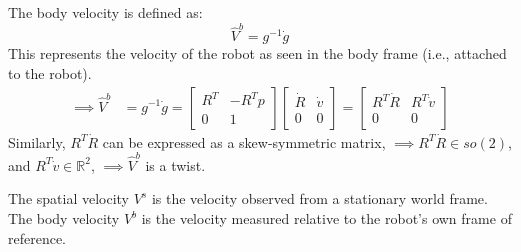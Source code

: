 The body velocity is defined as:
\[
    \hat{V}^{b} = g^{-1} \dot{g}
\]
This represents the velocity of the robot as seen in the body frame (i.e., attached to the robot).
\begin{align*}
    \implies
    \hat{V}^{b}
     & =
    g^{-1} \dot{g}
    =
    \begin{bmatrix}
        R^T & -R^T p \\
        0   & 1
    \end{bmatrix}
    \begin{bmatrix}
        \dot R & \dot v \\
        0      & 0
    \end{bmatrix}
    =
    \begin{bmatrix}
        R^T \dot R & R^T \dot v \\
        0          & 0
    \end{bmatrix}
\end{align*}
Similarly, \( R^T \dot R \) can be expressed as a skew-symmetric matrix, \( \implies R^T \dot R \in so(2) \),\\
and \( R^T \dot v \in \mathbb{R}^2 \), \( \implies \hat{V}^{b} \) is a twist.

The spatial velocity \( V^s \) is the velocity observed from a stationary world frame.
The body velocity \( V^b \) is the velocity measured relative to the robot's own frame of reference.
